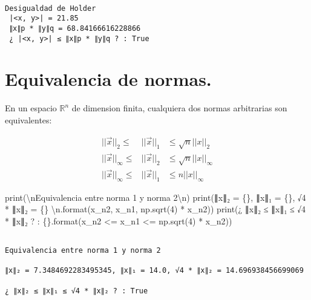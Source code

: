 \documentclass[
  letterpaper,
  DIV=11,
  numbers=noendperiod]{scrreprt}
\newenvironment{Shaded}{\begin{snugshade}}{\end{snugshade}}
\newcommand{\BuiltInTok}[1]{\textcolor[rgb]{0.00,0.23,0.31}{#1}}
\newcommand{\CharTok}[1]{\textcolor[rgb]{0.13,0.47,0.30}{#1}}
\newcommand{\DecValTok}[1]{\textcolor[rgb]{0.68,0.00,0.00}{#1}}
\newcommand{\NormalTok}[1]{\textcolor[rgb]{0.00,0.23,0.31}{#1}}
\newcommand{\OperatorTok}[1]{\textcolor[rgb]{0.37,0.37,0.37}{#1}}
\newcommand{\SpecialCharTok}[1]{\textcolor[rgb]{0.37,0.37,0.37}{#1}}
\newcommand{\StringTok}[1]{\textcolor[rgb]{0.13,0.47,0.30}{#1}}
\begin{document}
\begin{verbatim}

Desigualdad de Holder
 |<x, y>| = 21.85
 ∥x∥p * ∥y∥q = 68.84166616228866
 ¿ |<x, y>| ≤ ∥x∥p * ∥y∥q ? : True
\end{verbatim}

\section{Equivalencia de normas.}\label{equivalencia-de-normas.}

En un espacio \(\mathbb{R}^n\) de dimensi\textquotesingle on finita,
cualquiera dos normas arbitrarias son equivalentes:

\[
\begin{eqnarray*}
||\vec{x}||_2 \le & ||\vec{x}||_1 & \le \sqrt{n} ||x||_2 \\
||\vec{x}||_\infty \le & ||\vec{x}||_2 & \le \sqrt{n} ||x||_\infty \\
||\vec{x}||_\infty \le & ||\vec{x}||_1 & \le n ||x||_\infty
\end{eqnarray*}
\]

\begin{Shaded}
\begin{Highlighting}[]
\BuiltInTok{print}\NormalTok{(}\StringTok{\textquotesingle{}}\CharTok{\textbackslash{}n}\StringTok{Equivalencia entre norma 1 y norma 2}\CharTok{\textbackslash{}n}\StringTok{\textquotesingle{}}\NormalTok{)}
\BuiltInTok{print}\NormalTok{(}\StringTok{\textquotesingle{}∥x∥₂ = }\SpecialCharTok{\{\}}\StringTok{, ∥x∥₁ = }\SpecialCharTok{\{\}}\StringTok{, √4 * ∥x∥₂ = }\SpecialCharTok{\{\}}\StringTok{ }\CharTok{\textbackslash{}n}\StringTok{\textquotesingle{}}\NormalTok{.}\BuiltInTok{format}\NormalTok{(x\_n2, x\_n1, np.sqrt(}\DecValTok{4}\NormalTok{) }\OperatorTok{*}\NormalTok{ x\_n2))}
\BuiltInTok{print}\NormalTok{(}\StringTok{\textquotesingle{}¿ ∥x∥₂ ≤ ∥x∥₁ ≤ √4 * ∥x∥₂ ? : }\SpecialCharTok{\{\}}\StringTok{\textquotesingle{}}\NormalTok{.}\BuiltInTok{format}\NormalTok{(x\_n2 }\OperatorTok{\textless{}=}\NormalTok{ x\_n1 }\OperatorTok{\textless{}=}\NormalTok{ np.sqrt(}\DecValTok{4}\NormalTok{) }\OperatorTok{*}\NormalTok{ x\_n2))}
\end{Highlighting}
\end{Shaded}

\begin{verbatim}

Equivalencia entre norma 1 y norma 2

∥x∥₂ = 7.3484692283495345, ∥x∥₁ = 14.0, √4 * ∥x∥₂ = 14.696938456699069 

¿ ∥x∥₂ ≤ ∥x∥₁ ≤ √4 * ∥x∥₂ ? : True
\end{verbatim}
\end{document}
